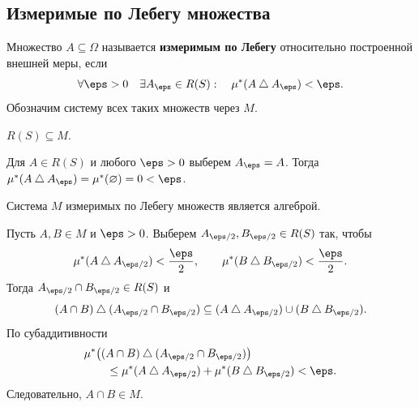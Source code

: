 \subsection{Измеримые по Лебегу множества}

\begin{definition}
    Множество $A\subseteq\Omega$ называется \textbf{измеримым по Лебегу}
    относительно построенной внешней меры, если
    \[
        \forall\eps>0\quad\exists A_\eps\in R(S):\quad
        \mu^*(A\mathbin{\triangle}A_\eps)<\eps.
    \]
    Обозначим систему всех таких множеств через $M$.
\end{definition}

\begin{theorem}
    $R(S)\subseteq M$.
\end{theorem}

\begin{Proof}
    Для $A\in R(S)$ и любого $\eps>0$ выберем $A_\eps=A$.
    Тогда $\mu^*(A\mathbin{\triangle}A_\eps)=\mu^*(\varnothing)=0<\eps$.
\end{Proof}

\begin{theorem}
    Система $M$ измеримых по Лебегу множеств является алгеброй.
\end{theorem}

\newpage
\begin{Proof}
    Пусть $A,B\in M$ и $\eps>0$. Выберем
    $A_{\eps/2},B_{\eps/2}\in R(S)$ так, чтобы
    \[
        \mu^*(A\mathbin{\triangle}A_{\eps/2})<\frac\eps2,
        \qquad
        \mu^*(B\mathbin{\triangle}B_{\eps/2})<\frac\eps2.
    \]
    Тогда $A_{\eps/2}\cap B_{\eps/2}\in R(S)$ и
    \[
        (A\cap B)\mathbin{\triangle}(A_{\eps/2}\cap B_{\eps/2})
        \subseteq
        (A\mathbin{\triangle}A_{\eps/2})
        \cup(B\mathbin{\triangle}B_{\eps/2}).
    \]
    По субаддитивности
    \[
        \begin{aligned}
            &\mu^*\bigl((A\cap B)\mathbin{\triangle}
                           (A_{\eps/2}\cap B_{\eps/2})\bigr)\\
            &\qquad\leq\mu^*(A\mathbin{\triangle}A_{\eps/2})
                      +\mu^*(B\mathbin{\triangle}B_{\eps/2})<\eps.
        \end{aligned}
    \]
    Следовательно, $A\cap B\in M$.
\end{Proof}

